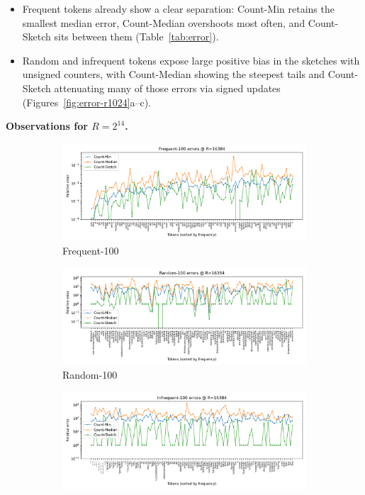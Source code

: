 \documentclass[11pt]{article}
\begin{document}
\begin{itemize}
  \item Frequent tokens already show a clear separation: Count-Min retains the smallest median error, Count-Median overshoots most often, and Count-Sketch sits between them (Table~\ref{tab:error}).
  \item Random and infrequent tokens expose large positive bias in the sketches with unsigned counters, with Count-Median showing the steepest tails and Count-Sketch attenuating many of those errors via signed updates (Figures~\ref{fig:error-r1024}a--c).
\end{itemize}

\newpage

\noindent\textbf{Observations for $R=2^{14}$.}

\begin{figure}[H]
  \centering
  \begin{subfigure}[t]{0.32\linewidth}
    \centering
    \includegraphics[width=\linewidth]{../outputs/a2/errors_R16384_Frequent_100.png}
    \caption{Frequent-100}
  \end{subfigure}
  \hfill
  \begin{subfigure}[t]{0.32\linewidth}
    \centering
    \includegraphics[width=\linewidth]{../outputs/a2/errors_R16384_Random_100.png}
    \caption{Random-100}
  \end{subfigure}
  \hfill
  \begin{subfigure}[t]{0.32\linewidth}
    \centering
    \includegraphics[width=\linewidth]{../outputs/a2/errors_R16384_Infrequent_100.png}

\end{subfigure}
\end{figure}
\end{document}
